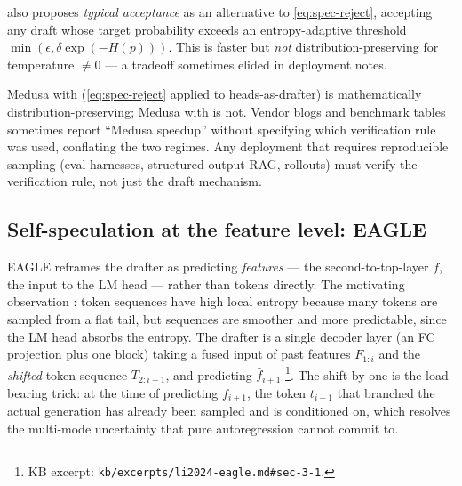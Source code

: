 \citet[\S 2.3.1]{cai2024-medusa} also proposes \emph{typical
acceptance} as an alternative to \cref{eq:spec-reject}, accepting any
draft whose target probability exceeds an entropy-adaptive threshold
$\min(\epsilon, \delta \exp(-H(p)))$. This is faster but \emph{not}
distribution-preserving for temperature $\neq 0$ --- a tradeoff
sometimes elided in deployment notes.

\begin{contradiction}
Medusa with  (\cref{eq:spec-reject} applied to
heads-as-drafter) is mathematically distribution-preserving; Medusa
with  is not. Vendor blogs and benchmark tables
sometimes report ``Medusa speedup'' without specifying which
verification rule was used, conflating the two regimes. Any deployment
that requires reproducible sampling (eval harnesses, structured-output
RAG,  rollouts) must verify the verification rule, not just the
draft mechanism.
\end{contradiction}

\subsection{Self-speculation at the feature level: EAGLE}
\label{sec:mt-eagle}

EAGLE \citep{li2024-eagle} reframes the drafter as predicting
\emph{features} --- the second-to-top-layer  $f$, the
input to the LM head --- rather than tokens directly. The motivating
observation \citep[abstract]{li2024-eagle}: token sequences have high
local entropy because many tokens are sampled from a flat tail, but
 sequences are smoother and more predictable, since the LM head
absorbs the entropy. The drafter is a single decoder layer (an FC
projection plus one  block) taking a fused input of past
features $F_{1:i}$ and the \emph{shifted} token sequence $T_{2:i+1}$,
and predicting $\hat f_{i+1}$ \citep[\S 3.1]{li2024-eagle}\footnote{KB
excerpt: \texttt{kb/excerpts/li2024-eagle.md\#sec-3-1}.}. The shift by
one is the load-bearing trick: at the time of predicting $f_{i+1}$,
the token $t_{i+1}$ that branched the actual generation has already
been sampled and is conditioned on, which resolves the multi-mode
uncertainty that pure  autoregression cannot commit to.

